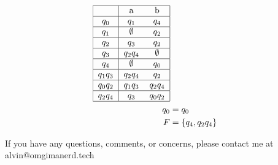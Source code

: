 \documentclass[letterpaper, 12pt]{math}
\begin{document}
\begin{enumerate}[(a)]
\begin{align*}
\begin{tabular}{|c|cc|}
      \hline
                   & a               & b               \\ \hline
      \( q_0    \) & \( q_1       \) & \( q_4       \) \\ \hline
      \( q_1    \) & \( \emptyset \) & \( q_2       \) \\ \hline
      \( q_2    \) & \( q_3       \) & \( q_2       \) \\ \hline
      \( q_3    \) & \( q_2q_4    \) & \( \emptyset \) \\ \hline
      \( q_4    \) & \( \emptyset \) & \( q_0       \) \\ \hline
      \( q_1q_3 \) & \( q_2q_4    \) & \( q_2       \) \\ \hline
      \( q_0q_2 \) & \( q_1q_3    \) & \( q_2q_4    \) \\ \hline
      \( q_2q_4 \) & \( q_3       \) & \( q_0q_2    \) \\ \hline
    \end{tabular} \\
    q_0 &= q_0 \\
    F &= \{q_4,q_2q_4\}
  \end{align*}
\end{enumerate}

\begin{center}
  If you have any questions, comments, or concerns, please contact me at
  alvin@omgimanerd.tech
\end{center}
\end{document}
